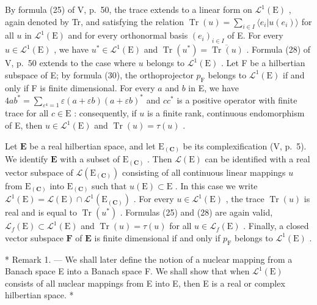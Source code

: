 By formula (25) of V, p.~50, the trace extends to a linear form on \(\mathcal{L}^1 (\mathrm{E})\) , again denoted by Tr, and satisfying the relation \(\operatorname{Tr}(u) = \sum_{i\in I}\langle e_i|u(e_i)\rangle\) for all \(u\) in \(\mathcal{L}^1 (\mathrm{E})\) and for every orthonormal basis \((e_i)_{i\in I}\) of E. For every \(u\in \mathcal{L}^1 (\mathrm{E})\) , we have \(u^{*}\in \mathcal{L}^{1}(\mathrm{E})\) and \(\operatorname {Tr}(u^{*}) = \overline{\operatorname{Tr}(u)}\) . Formula (28) of V, p.~50 extends to the case where \(u\) belongs to \(\mathcal{L}^1 (\mathrm{E})\) . Let F be a hilbertian subspace of E; by formula (30), the orthoprojector \(p_{\mathrm{F}}\) belongs to \(\mathcal{L}^1 (\mathrm{E})\) if and only if F is finite dimensional. For every \(a\) and \(b\) in E, we have \(4ab^{*} = \sum_{\varepsilon^{4} = 1}\varepsilon (a + \varepsilon b)(a + \varepsilon b)^{*}\) and \(cc^{*}\) is a positive operator with finite trace for all \(c\in \mathrm{E}\) : consequently, if \(u\) is a finite rank, continuous endomorphism of E, then \(u \in \mathcal{L}^1(\mathrm{E})\) and \(\operatorname{Tr}(u) = \tau(u)\) .

Let \(\mathbf{E}\) be a real hilbertian space, and let \(\mathrm{E}_{(\mathbf{C})}\) be its complexification (V, p.~5). We identify \(\mathbf{E}\) with a subset of \(\mathrm{E}_{(\mathbf{C})}\) . Then \(\mathcal{L}(\mathrm{E})\) can be identified with a real vector subspace of \(\mathcal{L}(\mathrm{E}_{(\mathbf{C})})\) consisting of all continuous linear mappings \(u\) from \(\mathrm{E}_{(\mathbf{C})}\) into \(\mathrm{E}_{(\mathbf{C})}\) such that \(u(\mathrm{E}) \subset \mathrm{E}\) . In this case we write \(\mathcal{L}^1(\mathrm{E}) = \mathcal{L}(\mathrm{E}) \cap \mathcal{L}^1(\mathrm{E}_{(\mathbf{C})})\) . For every \(u \in \mathcal{L}^1(\mathrm{E})\) , the trace \(\operatorname{Tr}(u)\) is real and is equal to \(\operatorname{Tr}(u^*)\) . Formulas (25) and (28) are again valid, \(\mathcal{L}_f(\mathrm{E}) \subset \mathcal{L}^1(\mathrm{E})\) and \(\operatorname{Tr}(u) = \tau(u)\) for all \(u \in \mathcal{L}_f(\mathrm{E})\) . Finally, a closed vector subspace \(\mathbf{F}\) of \(\mathbf{E}\) is finite dimensional if and only if \(p_{\mathrm{F}}\) belongs to \(\mathcal{L}^1(\mathrm{E})\) .

* Remark 1. --- We shall later define the notion of a nuclear mapping from a Banach space E into a Banach space F. We shall show that when \(\mathcal{L}^1 (\mathrm{E})\) consists of all nuclear mappings from E into E, then E is a real or complex hilbertian space. *

